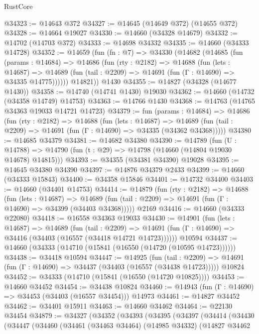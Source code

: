 \begin{lexlean}{RustCore}
\begin{coremodule}
@34323 := @14643 @372
@34327 := @14645 (@14649 @372) (@14655 @372)
@34328 := @14664 @19027
@34330 := @14660 (@34328 @14679)
@34332 := @14702 (@14703 @372)
@34333 := @14698 @34332
@34335 := @14660 (@34333 @14728)
@34352 := @14659
    (fun (fn : @7) =>
    @34330
      (@14682
        (@14685
          (fun (params : @14684) =>
          @14686
            (fun (rty : @2182) =>
            @14688
              (fun (lets : @14687) =>
              @14689 (fun (tail : @2209) => @14691 (fun (Γ : @14690) => @34335 @14775))))))
        @14821))
    @1430
@34355 := @14827 (@34328 (@14677 @1430))
@34358 := @14740 (@14741 @1430) @19030
@34362 := @14660 (@14732 (@34358 @14749) @14753)
@34363 := @14766 @1430
@34368 := @14763 (@14765 @34363 @19033 @14721 @14723)
@34379 := fun (params : @14684) =>
  @14686
    (fun (rty : @2182) =>
    @14688
      (fun (lets : @14687) =>
      @14689 (fun (tail : @2209) => @14691 (fun (Γ : @14690) => @34335 (@34362 @34368)))))
@34380 := @14685 @34379
@34381 := @14682 @34380
@34390 := @14789
    (fun (U : @14788) => @14790 (fun (t : @29) => @14798 (@14660 (@14804 @19030 @14678) @14815)))
@34393 := @34355 (@34381 @34390) @19028
@34395 := @14645 @34380 @34390
@34397 := @14876 @34379 @2433
@34399 := @14660 (@34333 @15843)
@34400 := @34358 @15846
@34401 := @14732 @34400
@34403 := @14660 (@34401 @14753)
@34414 := @14879
    (fun (rty : @2182) =>
    @14688
      (fun (lets : @14687) =>
      @14689 (fun (tail : @2209) => @14691 (fun (Γ : @14690) => @34399 (@34403 @34368)))))
    @2169
@34416 := @14660 (@34333 @22080)
@34418 := @16558 @34363 @19033
@34430 := @14901
    (fun (lets : @14687) =>
    @14689
      (fun (tail : @2209) =>
      @14691 (fun (Γ : @14690) => @34416 (@34403 (@16557 (@34418 @14721 @14723))))))
    @10594
@34437 := @14660 (@34333 (@14710 (@15841 (@16550 (@14720 (@10595 @14723))))))
@34438 := @34418 @10594
@34447 := @14925
    (fun (tail : @2209) => @14691 (fun (Γ : @14690) => @34437 (@34403 (@16557 (@34438 @14723)))))
    @10824
@34452 := @34333 (@14710 (@15841 (@16550 (@14720 @10825))))
@34453 := @14660 @34452
@34454 := @34438 @10824
@34460 := @14943 (fun (Γ : @14690) => @34453 (@34403 (@16557 @34454))) @14973
@34461 := @14827 @34452
@34462 := @34401 @15911
@34463 := @14660 @34462
@34464 := @22130 @34454
@34879 := @34327
    (@34352
      (@34393
        (@34395
          (@34397
            (@34414
              (@34430
                (@34447
                  (@34460
                    (@34461
                      (@34463 @34464)
                      (@14985 @34332)
                      (@14827
                        @34462

\end{coremodule}
\end{lexlean}
